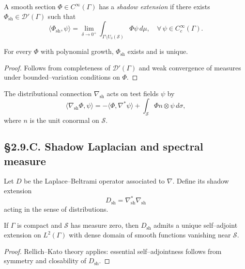 \begin{definition}
A smooth section $\Phi\in C^\infty(\Gamma)$ has a \emph{shadow extension}
if there exists $\Phi_{\mathrm{sh}}\in\mathcal{D}'(\Gamma)$ such that
\[
\langle \Phi_{\mathrm{sh}},\psi\rangle = \lim_{\delta\to0^+}\int_{\Gamma\setminus U_\delta(\mathcal{S})}\Phi\psi\,d\mu,
\quad \forall\,\psi\in C_c^\infty(\Gamma).
\]
\]
\end{definition}

\begin{lemma}
For every $\Phi$ with polynomial growth, $\Phi_{\mathrm{sh}}$ exists and is unique.
\end{lemma}

\begin{proof}
Follows from completeness of $\mathcal{D}'(\Gamma)$ and weak convergence of measures under
bounded–variation conditions on $\Phi$.
\end{proof}

\begin{definition}
The distributional connection $\nabla_{\mathrm{sh}}$ acts on test fields $\psi$ by
\[
\langle \nabla_{\mathrm{sh}}\Phi,\psi\rangle
=-\langle \Phi,\nabla^\ast\psi\rangle
+\int_{\mathcal{S}}\Phi n\!\otimes\!\psi\,d\sigma,
\]
where $n$ is the unit conormal on $\mathcal{S}$.
\]
\end{definition}

\subsection*{§2.9.C. Shadow Laplacian and spectral measure}

\begin{definition}
Let $D$ be the Laplace–Beltrami operator associated to $\nabla$.  
Define its shadow extension
\[
D_{\mathrm{sh}} = \nabla_{\mathrm{sh}}^\ast\nabla_{\mathrm{sh}}
\]
acting in the sense of distributions.
\]
\end{definition}

\begin{lemma}
If $\Gamma$ is compact and $\mathcal{S}$ has measure zero, then $D_{\mathrm{sh}}$ admits a unique
self–adjoint extension on $L^2(\Gamma)$ with dense domain of smooth functions vanishing near $\mathcal{S}$.
\end{lemma}

\begin{proof}
Rellich–Kato theory applies: essential self–adjointness follows from symmetry and closability of $D_{\mathrm{sh}}$.
\end{proof}

